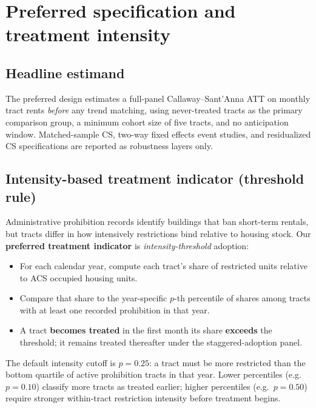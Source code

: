 
\section{Preferred specification and treatment intensity}\label{app:preferred-spec}

\subsection{Headline estimand}

The preferred design estimates a full-panel Callaway--Sant'Anna ATT on monthly tract rents \emph{before} any trend matching, using never-treated tracts as the primary comparison group, a minimum cohort size of five tracts, and no anticipation window.
Matched-sample CS, two-way fixed effects event studies, and residualized CS specifications are reported as robustness layers only.

\subsection{Intensity-based treatment indicator (threshold rule)}\label{app:treatment-intensity}

Administrative prohibition records identify buildings that ban short-term rentals, but tracts differ in how intensively restrictions bind relative to housing stock.
Our \textbf{preferred treatment indicator} is \emph{intensity-threshold} adoption:

\begin{itemize}
  \item For each calendar year, compute each tract's share of restricted units relative to ACS occupied housing units.
  \item Compare that share to the year-specific $p$-th percentile of shares among tracts with at least one recorded prohibition in that year.
  \item A tract \textbf{becomes treated} in the first month its share \textbf{exceeds} the threshold; it remains treated thereafter under the staggered-adoption panel.
\end{itemize}

The default intensity cutoff is $p=0.25$: a tract must be more restricted than the bottom quartile of active prohibition tracts in that year.
Lower percentiles (e.g.\ $p=0.10$) classify more tracts as treated earlier; higher percentiles (e.g.\ $p=0.50$) require stronger within-tract restriction intensity before treatment begins.

